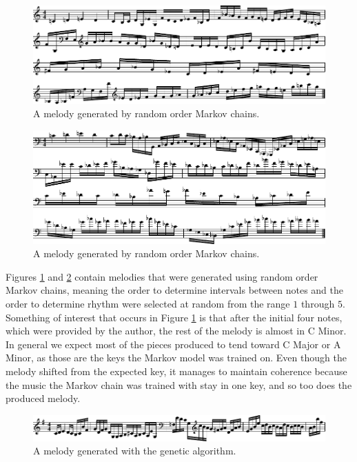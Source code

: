 \begin{figure}[h]
	\centering
	\includegraphics[width=\linewidth]{figures/markov_melody_3.pdf}
	\caption{A melody generated by random order Markov chains.}
	\label{fig:music:markov3}
\end{figure}

\begin{figure}[h]
	\centering
	\includegraphics[width=\linewidth]{figures/markov_melody_4.pdf}
	\caption{A melody generated by random order Markov chains.}
	\label{fig:music:markov4}
\end{figure}

Figures \ref{fig:music:markov3} and \ref{fig:music:markov4} contain melodies that were generated using random order Markov chains, meaning the order to determine intervals between notes and the order to determine rhythm were selected at random from the range $1$ through $5$.
Something of interest that occurs in Figure \ref{fig:music:markov3} is that after the initial four notes, which were provided by the author, the rest of the melody is almost in C Minor.
In general we expect most of the pieces produced to tend toward C Major or A Minor, as those are the keys the Markov model was trained on.
Even though the melody shifted from the expected key, it manages to maintain coherence because the music the Markov chain was trained with stay in one key, and so too does the produced melody.

\begin{figure}[h]
	\centering
	\includegraphics[width=\linewidth]{figures/genetic_melody_1.pdf}
	\caption{A melody generated with the genetic algorithm.}
	\label{fig:music:genetic1}
\end{figure}

